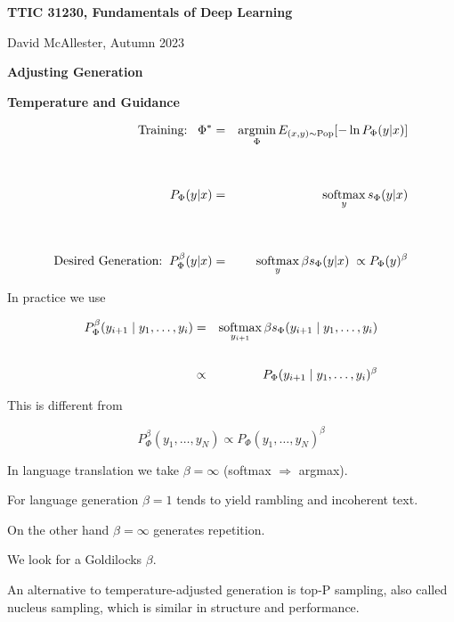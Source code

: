 

\usepackage{cancel}



{\Huge

  \centerline{\bf TTIC 31230, Fundamentals of Deep Learning}
  \bigskip
  \centerline{David McAllester, Autumn 2023}
  \vfill
  \vfil
  \centerline{\bf Adjusting Generation}
  \vfill
  \centerline{\bf Temperature and Guidance}
  \vfill
  \vfill

\begin{eqnarray*}
\mbox{Training:}\;\;\;\Phi^* & = & \operatorname*{argmin}_\Phi E_{(x,y) \sim \mathrm{Pop}}[-\ln P_\Phi(y|x)] \\
\\
\\
P_\Phi(y|x) & = & \operatorname*{softmax}_y s_\Phi(y|x) \\
\\
\\
\mbox{Desired Generation:}\;\;P^\beta_\Phi(y|x) & = & \operatorname*{softmax}_y \beta s_\Phi(y|x)\;\propto P_\Phi(y)^\beta
\end{eqnarray*}


In practice we use

\begin{eqnarray*}
P^\beta_\Phi(y_{i+1}\;|\;y_1,\ldots,y_i) & = & \operatorname*{softmax}_{y_{i+1}} \beta s_\Phi(y_{i+1}\;|\;y_1,\dots,y_i) \\
\\
& \propto &  P_\Phi(y_{i+1}\;|\;y_1,\ldots,y_i)^\beta
\end{eqnarray*}

\vfill
This is different from

\vfill
$$P^\beta_\Phi(y_1,\ldots,y_N) \propto P_\Phi(y_1,\ldots,y_N)^\beta$$


In language translation we take $\beta = \infty$ (softmax $\Rightarrow$ argmax).

\vfill
For language generation $\beta = 1$ tends to yield rambling and incoherent text.

\vfill
On the other hand $\beta = \infty$ generates repetition.

\vfill
We look for a Goldilocks $\beta$.

\vfill
An alternative to temperature-adjusted generation is top-P sampling, also called nucleus sampling, which is similar in structure and performance.

}
